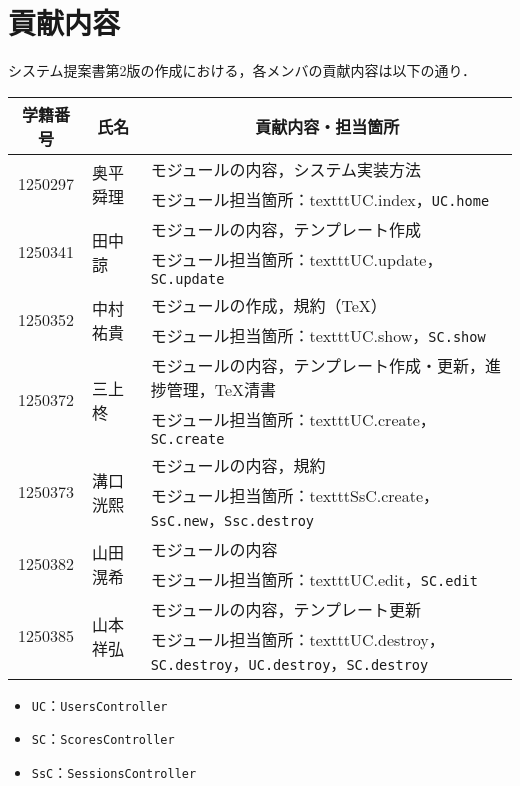 \chapter{貢献内容}
システム提案書第2版の作成における，各メンバの貢献内容は以下の通り．
\begin{table}[h]
    \centering
    \begin{tabularx}{\textwidth}{cll}
        \multicolumn{1}{c}{学籍番号} & \multicolumn{1}{c}{氏名} & \multicolumn{1}{c}{貢献内容・担当箇所}\\
        \hline
        \multirow{2}{*}{1250297} & \multirow{2}{*}{奥平 舜理} & モジュールの内容，システム実装方法\\
                                 &                        & モジュール担当箇所：texttt{UC.index}，\texttt{UC.home}\\
        \hline
        \multirow{2}{*}{1250341} & \multirow{2}{*}{田中 諒}  & モジュールの内容，テンプレート作成\\
                                 &                        & モジュール担当箇所：texttt{UC.update}，\texttt{SC.update}\\
        \hline
        \multirow{2}{*}{1250352} & \multirow{2}{*}{中村 祐貴} &  モジュールの作成，規約（\TeX ）\\
                                 &                        & モジュール担当箇所：texttt{UC.show}，\texttt{SC.show}\\
        \hline
        \multirow{2}{*}{1250372} & \multirow{2}{*}{三上 柊}  &  モジュールの内容，テンプレート作成・更新，進捗管理，\TeX 清書 \\
                                 &                        & モジュール担当箇所：texttt{UC.create}，\texttt{SC.create}\\
        \hline
        \multirow{2}{*}{1250373} & \multirow{2}{*}{溝口 洸熙} & モジュールの内容，規約\\
                                 &                        & モジュール担当箇所：texttt{SsC.create}，\texttt{SsC.new}，\texttt{Ssc.destroy}\\
        \hline
        \multirow{2}{*}{1250382} & \multirow{2}{*}{山田 滉希} & モジュールの内容\\
                                 &                        & モジュール担当箇所：texttt{UC.edit}，\texttt{SC.edit}\\
        \hline
        \multirow{2}{*}{1250385} & \multirow{2}{*}{山本 祥弘} & モジュールの内容，テンプレート更新\\
                                 &                        & モジュール担当箇所：texttt{UC.destroy}，\texttt{SC.destroy}，\texttt{UC.destroy}，\texttt{SC.destroy}\\
        \hline
    \end{tabularx}
\end{table}
\begin{itemize}
    \item \texttt{UC}：\texttt{UsersController}
    \item \texttt{SC}：\texttt{ScoresController}
    \item \texttt{SsC}：\texttt{SessionsController}
\end{itemize}